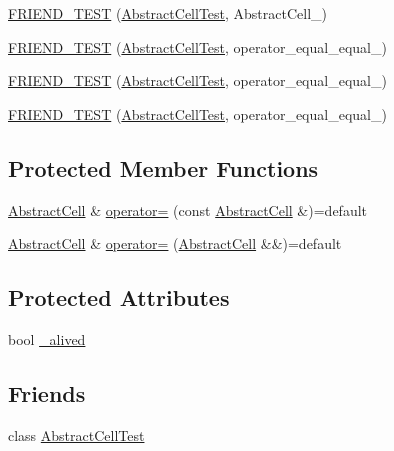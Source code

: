 \begin{DoxyCompactItemize}
\item 
\hyperlink{classAbstractCell_a126d29fd8943e3b611d51842a4d4de53}{F\-R\-I\-E\-N\-D\-\_\-\-T\-E\-S\-T} (\hyperlink{classAbstractCell_a8a83d646164e396527131ba80ec82bdc}{Abstract\-Cell\-Test}, Abstract\-Cell\-\_)
\item 
\hyperlink{classAbstractCell_a28b9bfbf4fcfa5ee7b2f0e6cdbfba7d6}{F\-R\-I\-E\-N\-D\-\_\-\-T\-E\-S\-T} (\hyperlink{classAbstractCell_a8a83d646164e396527131ba80ec82bdc}{Abstract\-Cell\-Test}, operator\-\_\-equal\-\_\-equal\-\_)
\item 
\hyperlink{classAbstractCell_a5f5173debbe09a8a170f7f61861cc397}{F\-R\-I\-E\-N\-D\-\_\-\-T\-E\-S\-T} (\hyperlink{classAbstractCell_a8a83d646164e396527131ba80ec82bdc}{Abstract\-Cell\-Test}, operator\-\_\-equal\-\_\-equal\-\_)
\item 
\hyperlink{classAbstractCell_a1fd4de21840d045a818c699c5f812f61}{F\-R\-I\-E\-N\-D\-\_\-\-T\-E\-S\-T} (\hyperlink{classAbstractCell_a8a83d646164e396527131ba80ec82bdc}{Abstract\-Cell\-Test}, operator\-\_\-equal\-\_\-equal\-\_)
\end{DoxyCompactItemize}
\subsection*{Protected Member Functions}
\begin{DoxyCompactItemize}
\item 
\hyperlink{classAbstractCell}{Abstract\-Cell} \& \hyperlink{classAbstractCell_ac24aa175a3d52191df86a7d1aefb85c5}{operator=} (const \hyperlink{classAbstractCell}{Abstract\-Cell} \&)=default
\item 
\hyperlink{classAbstractCell}{Abstract\-Cell} \& \hyperlink{classAbstractCell_a82608116be17096641ce4aa5cffe1018}{operator=} (\hyperlink{classAbstractCell}{Abstract\-Cell} \&\&)=default
\end{DoxyCompactItemize}
\subsection*{Protected Attributes}
\begin{DoxyCompactItemize}
\item 
bool \hyperlink{classAbstractCell_abdd4785483cace729e7fee7a1e53848c}{\-\_\-alived}
\end{DoxyCompactItemize}
\subsection*{Friends}
\begin{DoxyCompactItemize}
\item 
class \hyperlink{classAbstractCell_a8a83d646164e396527131ba80ec82bdc}{Abstract\-Cell\-Test}
\end{DoxyCompactItemize}


